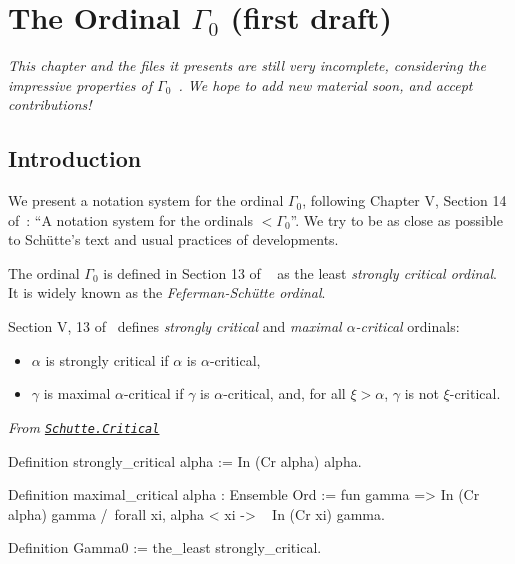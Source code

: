 {\chapter{The Ordinal \texorpdfstring{$\Gamma_0$}{Gamma0} (first draft)}


\emph{This chapter and the files it presents are still very incomplete, considering the impressive properties of $\Gamma_0$~\cite{Gallier91}.  We hope to add new material soon, and accept contributions!}


\section{Introduction}
We present a notation system for the ordinal $\Gamma_0$, following Chapter V, Section 14 of~\cite{schutte}: ``A notation system for the ordinals $<\Gamma_0$''.
We try to be as close as possible to Schütte's text and usual practices of \coq{} developments.

The ordinal $\Gamma_0$ is defined in Section 13 of ~\cite{schutte} as the least \emph{strongly critical ordinal}. It is widely known as the \emph{Feferman-Schütte ordinal}.


Section V, 13 of~\cite{schutte} defines \emph{strongly critical} and
\emph{maximal $\alpha$-critical} ordinals: 

\begin{itemize}
\item $\alpha$ is strongly critical if
$\alpha$ is $\alpha$-critical,
\item $\gamma$ is maximal $\alpha$-critical if $\gamma$ is $\alpha$-critical, and, for all $\xi>\alpha$, $\gamma$ is not $\xi$-critical.

\end{itemize}





\vspace{4pt}

\noindent\emph{From \href{../theories/html/hydras.Schutte.Critical.html\#strongly_critical}%
{\texttt{Schutte.Critical}}}

\begin{Coqsrc}
Definition strongly_critical alpha := In (Cr alpha) alpha.

Definition maximal_critical alpha : Ensemble Ord :=
  fun gamma =>
    In (Cr alpha) gamma /\
    forall xi, alpha < xi -> ~ In (Cr xi) gamma.

Definition Gamma0 := the_least strongly_critical.
\end{Coqsrc}

}
